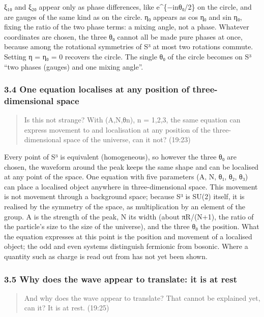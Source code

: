 \documentclass[
  a4paper,
]{article}
\begin{document}
ξ₁₀ and ξ₂₀ appear only as phase differences, like e\^{}\{−inθ₀/2\} on
the circle, and are gauges of the same kind as on the circle. η₀ appears
as cos η₀ and sin η₀, fixing the ratio of the two phase terms: a mixing
angle, not a phase. Whatever coordinates are chosen, the three θ₀ cannot
all be made pure phases at once, because among the rotational symmetries
of S³ at most two rotations commute. Setting η = η₀ = 0 recovers the
circle. The single θ₀ of the circle becomes on S³ ``two phases (gauges)
and one mixing angle''.

\subsubsection{3.4 One equation localises at any position of
three-dimensional
space}\label{one-equation-localises-at-any-position-of-three-dimensional-space}

\begin{quote}
Is this not strange? With (A,N,θn), n = 1,2,3, the same equation can
express movement to and localisation at any position of the
three-dimensional space of the universe, can it not? (19:23)
\end{quote}

Every point of S³ is equivalent (homogeneous), so however the three θ₀
are chosen, the waveform around the peak keeps the same shape and can be
localised at any point of the space. One equation with five parameters
(A, N, θ₁, θ₂, θ₃) can place a localised object anywhere in
three-dimensional space. This movement is not movement through a
background space; because S³ is SU(2) itself, it is realised by the
symmetry of the space, as multiplication by an element of the group. A
is the strength of the peak, N its width (about πR/(N+1), the ratio of
the particle's size to the size of the universe), and the three θ₀ the
position. What the equation expresses at this point is the position and
movement of a localised object; the odd and even systems distinguish
fermionic from bosonic. Where a quantity such as charge is read out from
has not yet been shown.

\subsubsection{3.5 Why does the wave appear to translate: it is at
rest}\label{why-does-the-wave-appear-to-translate-it-is-at-rest}

\begin{quote}
And why does the wave appear to translate? That cannot be explained yet,
can it? It is at rest. (19:25)
\end{quote}
\end{document}
